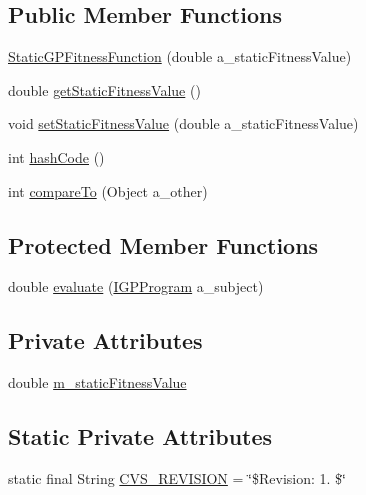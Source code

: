 \subsection*{Public Member Functions}
\begin{DoxyCompactItemize}
\item 
\hyperlink{classorg_1_1jgap_1_1gp_1_1impl_1_1_static_g_p_fitness_function_a8ba75bf82185263f84a6f5673ebffcf2}{Static\-G\-P\-Fitness\-Function} (double a\-\_\-static\-Fitness\-Value)
\item 
double \hyperlink{classorg_1_1jgap_1_1gp_1_1impl_1_1_static_g_p_fitness_function_a517736742d336176365a16b5254bc430}{get\-Static\-Fitness\-Value} ()
\item 
void \hyperlink{classorg_1_1jgap_1_1gp_1_1impl_1_1_static_g_p_fitness_function_ab9ad29fbfddc485e55636870d905df25}{set\-Static\-Fitness\-Value} (double a\-\_\-static\-Fitness\-Value)
\item 
int \hyperlink{classorg_1_1jgap_1_1gp_1_1impl_1_1_static_g_p_fitness_function_a0a9734c3ff4077fc2fee95d7c5278b21}{hash\-Code} ()
\item 
int \hyperlink{classorg_1_1jgap_1_1gp_1_1impl_1_1_static_g_p_fitness_function_a78e408d4927861688c9f88785349af93}{compare\-To} (Object a\-\_\-other)
\end{DoxyCompactItemize}
\subsection*{Protected Member Functions}
\begin{DoxyCompactItemize}
\item 
double \hyperlink{classorg_1_1jgap_1_1gp_1_1impl_1_1_static_g_p_fitness_function_a6c7d3a6b028de6926c85191ecaab0d63}{evaluate} (\hyperlink{interfaceorg_1_1jgap_1_1gp_1_1_i_g_p_program}{I\-G\-P\-Program} a\-\_\-subject)
\end{DoxyCompactItemize}
\subsection*{Private Attributes}
\begin{DoxyCompactItemize}
\item 
double \hyperlink{classorg_1_1jgap_1_1gp_1_1impl_1_1_static_g_p_fitness_function_ac455980ae334ece2d52c66652ffce165}{m\-\_\-static\-Fitness\-Value}
\end{DoxyCompactItemize}
\subsection*{Static Private Attributes}
\begin{DoxyCompactItemize}
\item 
static final String \hyperlink{classorg_1_1jgap_1_1gp_1_1impl_1_1_static_g_p_fitness_function_a166c55c9f8b378afe7826742ba0b50ed}{C\-V\-S\-\_\-\-R\-E\-V\-I\-S\-I\-O\-N} = \char`\"{}\$Revision\-: 1. \$\char`\"{}
\end{DoxyCompactItemize}
